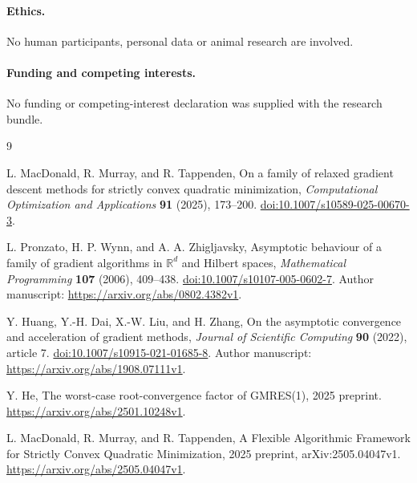 \documentclass[11pt,a4paper]{article}
\theoremstyle{remark}
\newcommand{\R}{\mathbb R}
\begin{document}
\paragraph{Ethics.}
No human participants, personal data or animal research are involved.
\paragraph{Funding and competing interests.}
No funding or competing-interest declaration was supplied with the research bundle.

\begin{thebibliography}{9}

L. MacDonald, R. Murray, and R. Tappenden,
On a family of relaxed gradient descent methods for strictly convex quadratic minimization,
\emph{Computational Optimization and Applications} \textbf{91} (2025), 173--200.
\href{https://doi.org/10.1007/s10589-025-00670-3}{doi:10.1007/s10589-025-00670-3}.

L. Pronzato, H. P. Wynn, and A. A. Zhigljavsky,
Asymptotic behaviour of a family of gradient algorithms in $\R^d$ and Hilbert spaces,
\emph{Mathematical Programming} \textbf{107} (2006), 409--438.
\href{https://doi.org/10.1007/s10107-005-0602-7}{doi:10.1007/s10107-005-0602-7}.
Author manuscript: \url{https://arxiv.org/abs/0802.4382v1}.

Y. Huang, Y.-H. Dai, X.-W. Liu, and H. Zhang,
On the asymptotic convergence and acceleration of gradient methods,
\emph{Journal of Scientific Computing} \textbf{90} (2022), article 7.
\href{https://doi.org/10.1007/s10915-021-01685-8}{doi:10.1007/s10915-021-01685-8}.
Author manuscript: \url{https://arxiv.org/abs/1908.07111v1}.

Y. He,
The worst-case root-convergence factor of GMRES(1),
2025 preprint.
\url{https://arxiv.org/abs/2501.10248v1}.

L. MacDonald, R. Murray, and R. Tappenden,
A Flexible Algorithmic Framework for Strictly Convex Quadratic Minimization,
2025 preprint, arXiv:2505.04047v1.
\url{https://arxiv.org/abs/2505.04047v1}.

\end{thebibliography}
\end{document}
